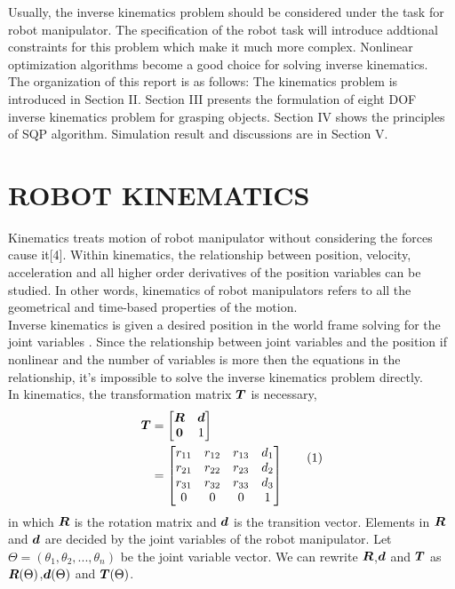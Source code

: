 \documentclass[journal,comsoc]{IEEEtran}
\begin{document}
Usually, the inverse kinematics problem should be considered under the task for robot manipulator. The specification of the robot task will introduce addtional constraints for this problem which make  it much more complex. Nonlinear optimization algorithms become a good choice for solving inverse kinematics. \\

The organization of this report is as follows: The kinematics problem is introduced in Section II. Section III presents the formulation of eight DOF inverse kinematics problem for grasping objects. Section IV shows the principles of SQP algorithm. Simulation result and discussions are  in Section V.  




\section{ROBOT KINEMATICS}
Kinematics treats motion of robot manipulator without considering the forces cause it[4]. Within kinematics, the relationship between position, velocity, acceleration and all higher order derivatives of the position variables can be studied. In other words, kinematics of robot manipulators refers to all the geometrical and time-based properties of the motion. \\

Inverse kinematics is given a desired position in the world frame solving for the joint variables . Since the relationship between joint variables and the position if nonlinear and the number of variables is more then the equations in the relationship, it's impossible to solve the inverse kinematics problem directly. \\

In kinematics, the transformation matrix $\mbox{\boldmath $T$}$ is necessary, 
\[
\begin{split}
\mbox{\boldmath $T$} &= 
  \left[
  \begin{matrix}
  \mbox{\boldmath $R$} & \mbox{\boldmath $d$} \\
  \mbox{\boldmath $0$}& 1 
  \end{matrix}  
  \right] \\
  &=
  \left[
  \begin{matrix}
  r_{11} & r_{12} & r_{13} & d_1 \\
  r_{21} & r_{22} & r_{23} & d_2 \\
  r_{31} & r_{32} & r_{33} & d_3 \\
  0 & 0 & 0 & 1 
  \end{matrix} 
  \right] 
  \end{split} \tag{1}
\] 
in which $\mbox{\boldmath $R$}$ is the rotation matrix and $\mbox{\boldmath $d$}$ is the transition vector. Elements in $\mbox{\boldmath $R$}$ and $\mbox{\boldmath $d$}$ are decided by the joint variables of the robot manipulator. Let $\Theta = (\theta_1, \theta_2, ..., \theta_n)$ be the joint variable vector. We can rewrite $\mbox{\boldmath $R$}$,$\mbox{\boldmath $d$}$ and $\mbox{\boldmath $T$}$ as $\mbox{\boldmath $R$}(\Theta)$,$\mbox{\boldmath $d$}(\Theta)$ and $\mbox{\boldmath $T$}(\Theta)$.  \\
\end{document}
